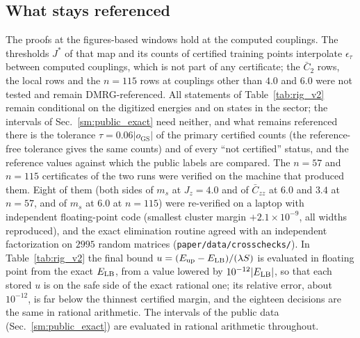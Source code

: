 \documentclass[aps,prx,onecolumn,10pt,nofootinbib,longbibliography,floatfix]{revtex4-2}
\theoremstyle{remark}
\newcommand{\Jz}{J_z}
\newcommand{\ms}{m_s}
\newcommand{\Czz}{\bar C_{zz}}
\newcommand{\Ctwo}{\bar C_{2}}
\newcommand{\GS}{\mathrm{GS}}
\begin{document}
\subsection{What stays referenced}
The proofs at the figures-based windows hold at the computed couplings. The thresholds $J^*$ of that map and its counts of certified training points
interpolate $\epsilon_\tau$ between computed couplings, which is not part of any certificate; the $\Ctwo$ rows, the
local rows and the $n=115$ rows at couplings other than $4.0$ and $6.0$ were not tested and remain DMRG-referenced. All %
statements of Table~\ref{tab:rig_v2} remain conditional on the digitized energies and on states in the sector; the
intervals of Sec.~\ref{sm:public_exact} need neither, and what remains referenced there is the tolerance
$\tau=0.06|o_\GS|$ of the primary certified counts (the reference-free tolerance gives the same counts) and of every %
``not certified'' status, and the reference values against which the public labels are compared. The
$n=57$ and $n=115$ certificates of the two runs were verified on the machine that produced them. Eight of them (both sides of
$\ms$ at $\Jz=4.0$ and of $\Czz$ at $6.0$ and $3.4$ at $n=57$, and of $\ms$ at $6.0$ at $n=115$) were re-verified on %
a laptop with independent floating-point code (smallest cluster margin $+2.1\times10^{-9}$, all widths reproduced), %
and the exact elimination routine agreed with an independent factorization on $2995$ random matrices %
(\texttt{paper/\allowbreak data/\allowbreak crosschecks/}). In Table~\ref{tab:rig_v2} the final bound $u=(E_{\rm up}-E_{\rm LB})/(\lambda S)$ is evaluated in
floating point from the exact $E_{\rm LB}$, from a value lowered by $10^{-12}|E_{\rm LB}|$, so that each stored $u$ is %
on the safe side of the exact rational one; its relative error, about $10^{-12}$, is far below the thinnest %
certified margin, and the eighteen decisions are the same in rational arithmetic. The intervals of the public data %
(Sec.~\ref{sm:public_exact}) are evaluated in rational arithmetic throughout.
\end{document}
